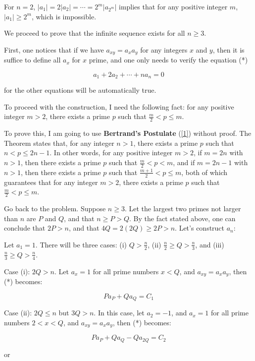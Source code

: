 \begin{enumerate}
 For $n=2$, $|a_1| = 2 |a_2| = \cdots = 2^m |a_{2^m}|$ implies that for any positive integer $m$, $|a_1| \ge 2^m$, which is impossible.

 We proceed to prove that the infinite sequence exists for all $n\ge 3$.

 First, one notices that if we have $a_{xy} = a_x a_y$ for any integers $x$ and $y$, then it is suffice to define all $a_x$ for $x$ prime, and one only needs to verify the equation (*)

 
 \[a_1+2a_2+\cdots+na_n=0\]

 for the other equations will be automatically true.

 To proceed with the construction, I need the following fact: for any positive integer $m>2$, there exists a prime $p$ such that $\frac{m}{2} <p \le m$.

 To prove this, I am going to use \textbf{Bertrand's Postulate} (\href{https://artofproblemsolving.comhttp://en.wikipedia.org/wiki/Bertrand's\_postulate}{[1]}) without proof. The Theorem states that, for any integer $n>1$, there exists a prime $p$ such that $n<p\le 2n-1$. In other words, for any positive integer $m>2$, if $m=2n$ with $n>1$, then there exists a prime $p$ such that $\frac{m}{2} < p <  m$, and if $m=2n-1$ with $n>1$, then there exists a prime $p$ such that $\frac{m+1}{2} <p\le m$, both of which guarantees that for any integer $m>2$, there exists a prime $p$ such that $\frac{m}{2} <p \le m$.

 


 
Go back to the problem. Suppose $n\ge 3$. Let the largest two primes not larger than $n$ are $P$ and $Q$, and that $n\ge P > Q$. By the fact stated above, one can conclude that $2P > n$, and that $4Q = 2(2Q) \ge 2P > n$. Let's construct $a_n$:

 Let $a_1=1$. There will be three cases: (i) $Q>\frac{n}{2}$,  (ii) $\frac{n}{2} \ge Q > \frac{n}{3}$, and (iii) $\frac{n}{3} \ge Q > \frac{n}{4}$.

 Case (i): $2Q>n$. Let $a_x = 1$ for all prime numbers $x<Q$, and $a_{xy}=a_xa_y$, then (*) becomes:

 
 \[Pa_P + Qa_Q = C_1\]

 Case (ii): $2Q\le n$ but $3Q > n$. In this case, let $a_2=-1$, and $a_x = 1$ for all prime numbers $2<x<Q$, and $a_{xy}=a_xa_y$, then (*) becomes:

 
 \[Pa_P + Qa_Q - Qa_{2Q} = C_2\]

 or


\end{enumerate}
